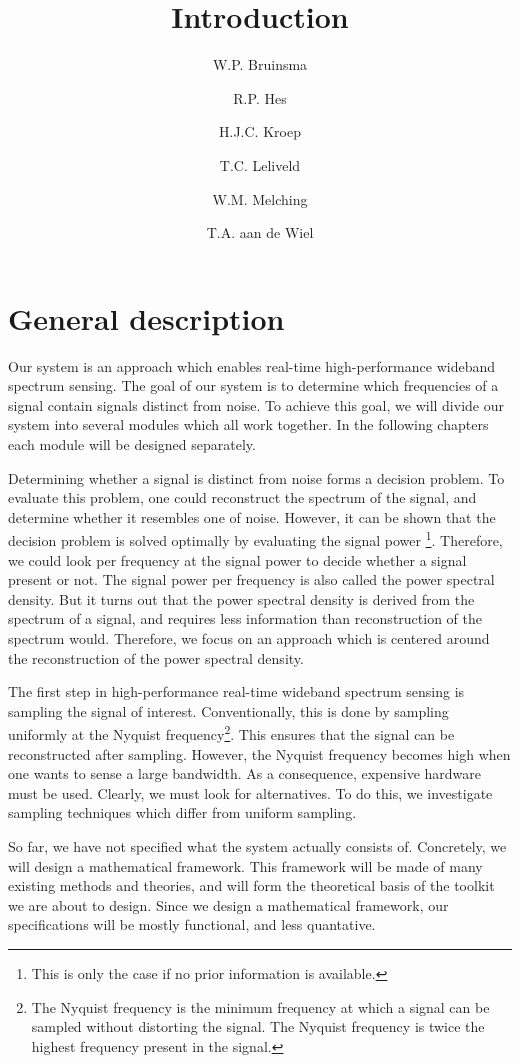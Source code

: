 \documentclass[a4paper, openany, oneside]{memoir}
\title{Introduction}
\author{W.P. Bruinsma \and R.P. Hes \and H.J.C. Kroep \and T.C. Leliveld \and W.M. Melching \and T.A. aan de Wiel}
\begin{document}
\section{General description}
Our system is an approach which enables real-time high-performance wideband spectrum sensing. The goal of our system is to determine which frequencies of a signal contain signals distinct from noise. To achieve this goal, we will divide our system into several modules which all work together. In the following chapters each module will be designed separately.

Determining whether a signal is distinct from noise forms a decision problem. To evaluate this problem, one could reconstruct the spectrum of the signal, and determine whether it resembles one of noise. However, it can be shown that the decision problem is solved optimally by evaluating the signal power \cite{axell2012spectrum}\footnote{This is only the case if no prior information is available.}. Therefore, we could look per frequency at the signal power to decide whether a signal present or not. The signal power per frequency is also called the power spectral density. But it turns out that the power spectral density is derived from the spectrum of a signal, and requires less information than reconstruction of the spectrum would. Therefore, we focus on an approach which is centered around the reconstruction of the power spectral density.

The first step in high-performance real-time wideband spectrum sensing is sampling the signal of interest. Conventionally, this is done by sampling uniformly at the Nyquist frequency\footnote{The Nyquist frequency is the minimum frequency at which a signal can be sampled without distorting the signal. The Nyquist frequency is twice the highest frequency present in the signal.}. This ensures that the signal can be reconstructed after sampling. However, the Nyquist frequency becomes high when one wants to sense a large bandwidth. As a consequence, expensive hardware must be used. Clearly, we must look for alternatives. To do this, we investigate sampling techniques which differ from uniform sampling.

So far, we have not specified what the system actually consists of. Concretely, we will design a mathematical framework. This framework will be made of many existing methods and theories, and will form the theoretical basis of the toolkit we are about to design. Since we design a mathematical framework, our specifications will be mostly functional, and less quantative. 
\end{document}
